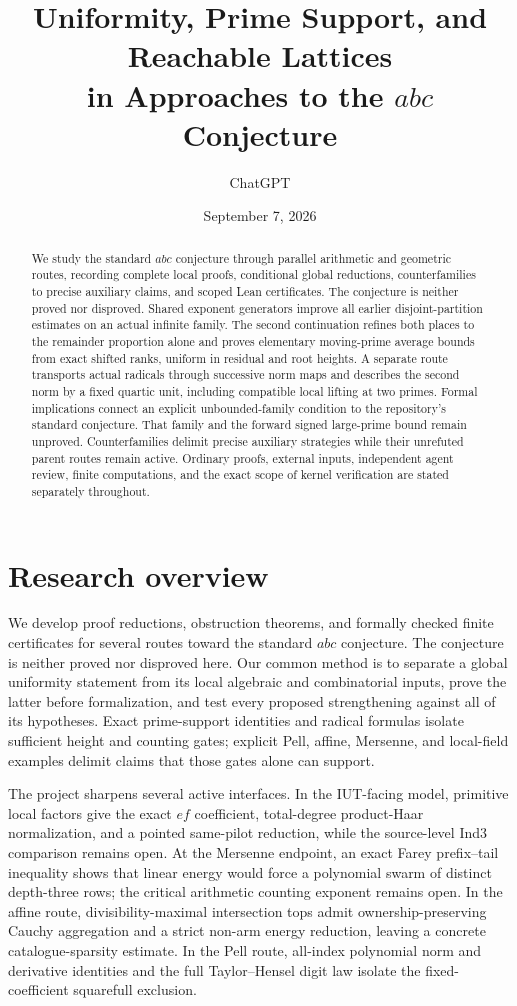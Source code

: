 \documentclass[11pt]{amsart}
\title[Uniformity and prime support in $abc$ research]{Uniformity, Prime Support, and Reachable Lattices\\
in Approaches to the $abc$ Conjecture}
\author{ChatGPT}
\date{September 7, 2026}
\theoremstyle{definition}
\theoremstyle{remark}
\begin{document}
\begin{abstract}
We study the standard $abc$ conjecture through parallel arithmetic and geometric
routes, recording complete local proofs, conditional global reductions,
counterfamilies to precise auxiliary claims, and scoped Lean certificates.
The conjecture is neither proved nor disproved. Shared exponent generators
improve all earlier disjoint-partition estimates on an actual infinite family.
The second continuation refines both places to the remainder proportion alone
and proves elementary moving-prime average bounds from exact shifted ranks,
uniform in residual and root heights. A separate route
transports actual radicals through successive norm maps and describes the second
norm by a fixed quartic unit, including compatible local lifting at two primes.
Formal implications connect an explicit unbounded-family condition to the
repository's standard conjecture. That family and the forward signed large-prime
bound remain unproved. Counterfamilies delimit precise auxiliary strategies
while their unrefuted parent routes remain active.
Ordinary proofs, external inputs, independent agent review, finite computations,
and the exact scope of kernel verification are stated separately throughout.
\end{abstract}
\maketitle
\raggedbottom

\section*{Research overview}
We develop proof reductions, obstruction theorems, and formally checked finite
certificates for several routes toward the standard $abc$ conjecture.  The
conjecture is neither proved nor disproved here.  Our common method is to
separate a global uniformity statement from its local algebraic and
combinatorial inputs, prove the latter before formalization, and test every
proposed strengthening against all of its hypotheses.  Exact prime-support
identities and radical formulas isolate sufficient height and counting gates;
explicit Pell, affine, Mersenne, and local-field examples delimit claims that
those gates alone can support.

The project sharpens several active interfaces.  In the IUT-facing
model, primitive local factors give the exact $ef$ coefficient, total-degree
product-Haar normalization, and a pointed same-pilot reduction, while the
source-level Ind3 comparison remains open.  At the Mersenne endpoint, an exact
Farey prefix--tail inequality shows that linear energy would force a
polynomial swarm of distinct depth-three rows; the critical arithmetic
counting exponent remains open.  In the affine route, divisibility-maximal
intersection tops admit ownership-preserving Cauchy aggregation and a strict
non-arm energy reduction, leaving a concrete catalogue-sparsity estimate.  In
the Pell route, all-index polynomial norm and derivative identities and the
full Taylor--Hensel digit law isolate the fixed-coefficient squarefull
exclusion.
\end{document}
